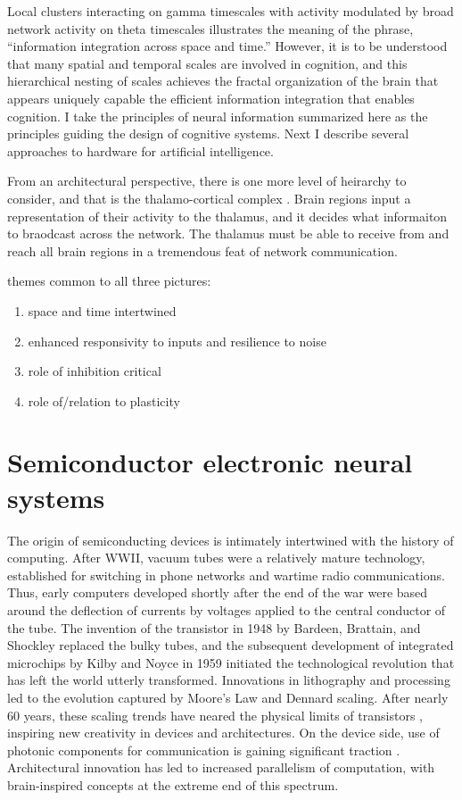 \documentclass[twocolumn]{article}
\begin{document}
Local clusters interacting on gamma timescales with activity modulated by broad network activity on theta timescales illustrates the meaning of the phrase, ``information integration across space and time.'' However, it is to be understood that many spatial and temporal scales are involved in cognition, and this hierarchical nesting of scales achieves the fractal organization of the brain that appears uniquely capable the efficient information integration that enables cognition. I take the principles of neural information summarized here as the principles guiding the design of cognitive systems. Next I describe several approaches to hardware for artificial intelligence.

\vspace{3em}
From an architectural perspective, there is one more level of heirarchy to consider, and that is the thalamo-cortical complex \cite{}. Brain regions input a representation of their activity to the thalamus, and it decides what informaiton to braodcast across the network. The thalamus must be able to receive from and reach all brain regions in a tremendous feat of network communication.

\vspace{3em}
themes common to all three pictures:
\begin{enumerate}
\item space and time intertwined
\item enhanced responsivity to inputs and resilience to noise
\item role of inhibition critical
\item role of/relation to plasticity
\end{enumerate}

\section{\label{sec:electronics}Semiconductor electronic neural systems}
\cite{navo2016}

The origin of semiconducting devices is intimately intertwined with the history of computing. After WWII, vacuum tubes were a relatively mature technology, established for switching in phone networks and wartime radio communications. Thus, early computers developed shortly after the end of the war were based around the deflection of currents by voltages applied to the central conductor of the tube. The invention of the transistor in 1948 by Bardeen, Brattain, and Shockley replaced the bulky tubes, and the subsequent development of integrated microchips by Kilby and Noyce in 1959 initiated the technological revolution that has left the world utterly transformed. Innovations in lithography and processing led to the evolution captured by Moore's Law and Dennard scaling. After nearly 60 years, these scaling trends have neared the physical limits of transistors \cite{}, inspiring new creativity in devices and architectures. On the device side, use of photonic components for communication is gaining significant traction \cite{suwa2015,stra2018}. Architectural innovation has led to increased parallelism of computation, with brain-inspired concepts at the extreme end of this spectrum.
\end{document}
